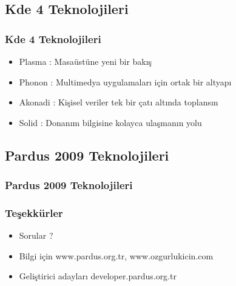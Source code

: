 \documentclass{beamer}
\begin{document}
\subsection{Kde 4 Teknolojileri}
\frame
{
    \frametitle{Kde 4 Teknolojileri}
    \begin{itemize}
       \item Plasma  : Masaüstüne yeni bir bakış
       \item Phonon  : Multimedya uygulamaları için ortak bir altyapı
       \item Akonadi : Kişisel veriler tek bir çatı altında toplansın
       \item Solid   : Donanım bilgisine kolayca ulaşmanın yolu
    \end{itemize}

}

\subsection{Pardus 2009 Teknolojileri}
\frame
{
    \frametitle{Pardus 2009 Teknolojileri}
    \begin{center}{}\end{center}
}

\frame
{
	\frametitle{Teşekkürler}
	\begin{itemize}
        \item Sorular ?
        \item Bilgi için www.pardus.org.tr, www.ozgurlukicin.com
        \item Geliştirici adayları developer.pardus.org.tr
	\end{itemize}

}
\end{document}
